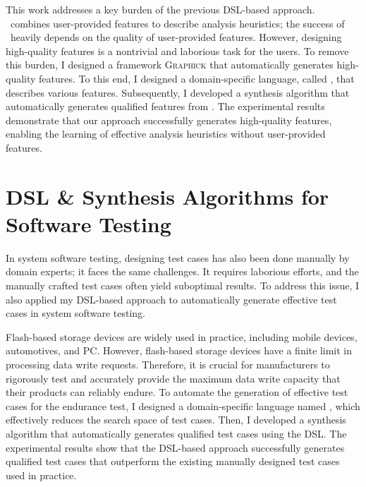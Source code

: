 \documentclass[11pt]{article}
\newcommand{\myparagraph}[1]{\medskip\noindent{\it \textbf{#1.}}}
\begin{document}
\myparagraph{Graphick~\cite{Jeon20}}
%
This work addresses a key burden of the previous DSL-based approach. 
%
\DisjunctiveModel~combines user-provided features to describe analysis heuristics; the success of \DisjunctiveModel~heavily depends on the quality of user-provided features.
%
However, designing high-quality features is a nontrivial and laborious task for the users.
%
To remove this burden, I designed a framework \textsc{Graphick} that automatically generates high-quality features.
%
To this end, I designed a domain-specific language, called \FeatureLanguage, that describes various features.
%
Subsequently, I developed a synthesis algorithm that automatically generates qualified features from \FeatureLanguage.
%
The experimental results demonstrate that our approach successfully generates high-quality features, enabling the learning of effective analysis heuristics without user-provided features.




\section{DSL \& Synthesis Algorithms for Software Testing}
%
In system software testing, designing test cases has also been done manually by domain experts; it faces the same challenges.
It requires laborious efforts, and the manually crafted test cases often yield suboptimal results.
%
To address this issue, I also applied my DSL-based approach to automatically generate effective test cases in system software testing.




\myparagraph{ARES~\cite{ARES23}}
%
Flash-based storage devices are widely used in practice, including mobile devices, automotives, and PC. 
%
However, flash-based storage devices have a finite limit in processing data write requests.
%
Therefore, it is crucial for manufacturers to rigorously test and accurately provide the maximum data write capacity that their products can reliably endure.
%
To automate the generation of effective test cases for the endurance test, I designed a domain-specific language named \AbstractRelativeWritePattern, which effectively reduces the search space of test cases.
%
Then, I developed a synthesis algorithm that automatically generates qualified test cases using the DSL.
%
The experimental results show that the DSL-based approach successfully generates qualified test cases that outperform the existing manually designed test cases used in practice.
\end{document}
